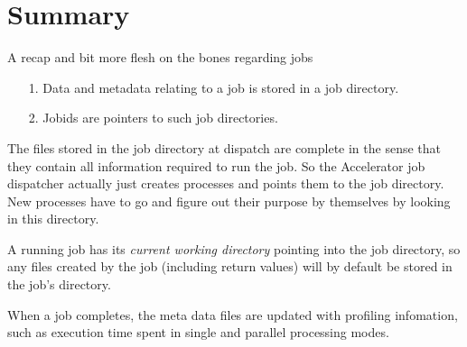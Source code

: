 \clearpage
\section{Summary}
A recap and bit more flesh on the bones regarding jobs
\begin{itemize}
\item[1.]  Data and metadata relating to a job is stored in a job directory.
\item[2.]  Jobids are pointers to such job directories.
\end{itemize}
The files stored in the job directory at dispatch are complete in the
sense that they contain all information required to run the job.  So
the Accelerator job dispatcher actually just creates processes and
points them to the job directory.  New processes have to go and figure
out their purpose by themselves by looking in this directory.

A running job has its \textsl{current working directory} pointing into
the job directory, so any files created by the job (including return
values) will by default be stored in the job's directory.

When a job completes, the meta data files are updated with profiling
infomation, such as execution time spent in single and parallel
processing modes.

